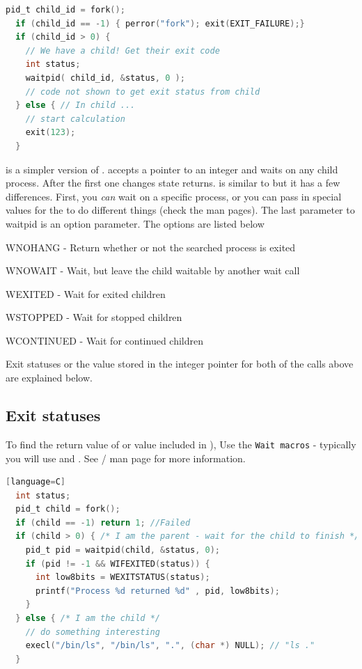 \begin{itemize}
\begin{lstlisting}[language=C]
  pid_t child_id = fork();
  if (child_id == -1) { perror("fork"); exit(EXIT_FAILURE);}
  if (child_id > 0) {
    // We have a child! Get their exit code
    int status;
    waitpid( child_id, &status, 0 );
    // code not shown to get exit status from child
  } else { // In child ...
    // start calculation
    exit(123);
  }
\end{lstlisting}

 is a simpler version of .
 accepts a pointer to an integer and waits on any child process.
After the first one changes state  returns.
 is similar to  but it has a few differences.
First, you \textit{can} wait on a specific process, or you can pass in special values for the  to do different things (check the man pages).
The last parameter to waitpid is an option parameter.
The options are listed below


\begin{enunmerate}
\item WNOHANG - Return whether or not the searched process is exited
\item WNOWAIT - Wait, but leave the child waitable by another wait call
\item WEXITED - Wait for exited children
\item WSTOPPED - Wait for stopped children
\item WCONTINUED - Wait for continued children
\end{enunmerate}

Exit statuses or the value stored in the integer pointer for both of the calls above are explained below.

\subsection{Exit statuses}

To find the return value of  or value included in ), Use the \texttt{Wait macros} - typically you will use  and  .
See / man page for more information.

\begin{lstlisting}[language=C][language=C]
  int status;
  pid_t child = fork();
  if (child == -1) return 1; //Failed
  if (child > 0) { /* I am the parent - wait for the child to finish */
    pid_t pid = waitpid(child, &status, 0);
    if (pid != -1 && WIFEXITED(status)) {
      int low8bits = WEXITSTATUS(status);
      printf("Process %d returned %d" , pid, low8bits);
    }
  } else { /* I am the child */
    // do something interesting
    execl("/bin/ls", "/bin/ls", ".", (char *) NULL); // "ls ."
  }
\end{lstlisting}


\end{itemize}
